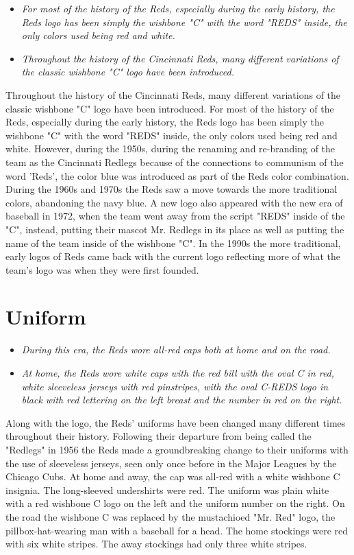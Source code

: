 \begin{itemize}
\item
  \emph{For most of the history of the Reds, especially during the early
  history, the Reds logo has been simply the wishbone "C" with the word
  "REDS" inside, the only colors used being red and white.}
\item
  \emph{Throughout the history of the Cincinnati Reds, many different
  variations of the classic wishbone "C" logo have been introduced.}
\end{itemize}

Throughout the history of the Cincinnati Reds, many different variations
of the classic wishbone "C" logo have been introduced. For most of the
history of the Reds, especially during the early history, the Reds logo
has been simply the wishbone "C" with the word "REDS" inside, the only
colors used being red and white. However, during the 1950s, during the
renaming and re-branding of the team as the Cincinnati Redlegs because
of the connections to communism of the word 'Reds', the color blue was
introduced as part of the Reds color combination. During the 1960s and
1970s the Reds saw a move towards the more traditional colors,
abandoning the navy blue. A new logo also appeared with the new era of
baseball in 1972, when the team went away from the script "REDS" inside
of the "C", instead, putting their mascot Mr. Redlegs in its place as
well as putting the name of the team inside of the wishbone "C". In the
1990s the more traditional, early logos of Reds came back with the
current logo reflecting more of what the team's logo was when they were
first founded.

\section{Uniform}\label{uniform}

\begin{itemize}
\item
  \emph{During this era, the Reds wore all-red caps both at home and on
  the road.}
\item
  \emph{At home, the Reds wore white caps with the red bill with the
  oval C in red, white sleeveless jerseys with red pinstripes, with the
  oval C-REDS logo in black with red lettering on the left breast and
  the number in red on the right.}
\end{itemize}

Along with the logo, the Reds' uniforms have been changed many different
times throughout their history. Following their departure from being
called the "Redlegs" in 1956 the Reds made a groundbreaking change to
their uniforms with the use of sleeveless jerseys, seen only once before
in the Major Leagues by the Chicago Cubs. At home and away, the cap was
all-red with a white wishbone C insignia. The long-sleeved undershirts
were red. The uniform was plain white with a red wishbone C logo on the
left and the uniform number on the right. On the road the wishbone C was
replaced by the mustachioed "Mr. Red" logo, the pillbox-hat-wearing man
with a baseball for a head. The home stockings were red with six white
stripes. The away stockings had only three white stripes.

